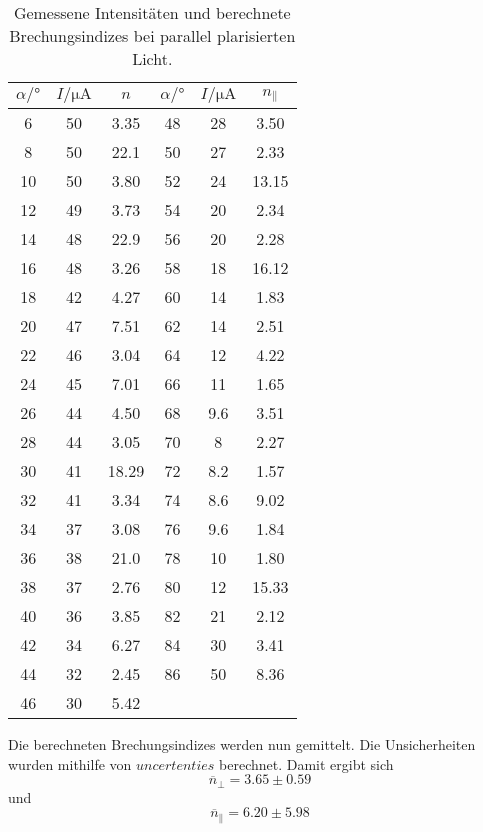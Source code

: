 \begin{table}[H]
  \centering
  \caption{Gemessene Intensitäten und berechnete Brechungsindizes bei parallel plarisierten Licht.}
  \label{tab:para}
  \begin{tabular}{c c c c c c}
    \toprule
    $\alpha /°$ & $I / \unit{\micro\ampere}$ & $n$ & $\alpha /°$ & $I / \unit{\micro\ampere}$ & $n_\parallel$\\
    \midrule 
    6  &  50  & 3.35  & 48 &  28   & 3.50 \\ 
    8  &  50  & 22.1  & 50 &  27   & 2.33 \\
    10 &  50  & 3.80  & 52 &  24   & 13.15 \\
    12 &  49  & 3.73  & 54 &  20   & 2.34  \\
    14 &  48  & 22.9  & 56 &  20   & 2.28  \\
    16 &  48  & 3.26  & 58 &  18   & 16.12 \\
    18 &  42  & 4.27  & 60 &  14   & 1.83  \\
    20 &  47  & 7.51  & 62 &  14   & 2.51  \\
    22 &  46  & 3.04  & 64 &  12   & 4.22  \\
    24 &  45  & 7.01  & 66 &  11   & 1.65  \\
    26 &  44  & 4.50  & 68 &  9.6  & 3.51  \\
    28 &  44  & 3.05  & 70 &  8    & 2.27  \\
    30 &  41  & 18.29  & 72 &  8.2  & 1.57  \\
    32 &  41  & 3.34  & 74 &  8.6  & 9.02   \\
    34 &  37  & 3.08  & 76 &  9.6  & 1.84  \\
    36 &  38  & 21.0  & 78 &  10   & 1.80  \\
    38 &  37  & 2.76  & 80 &  12   & 15.33  \\
    40 &  36  & 3.85  & 82 &  21   & 2.12  \\
    42 &  34  & 6.27  & 84 &  30   & 3.41   \\
    44 &  32  & 2.45  & 86 &  50   & 8.36   \\
    46 &  30  & 5.42  &    &       &      \\
    \bottomrule
  \end{tabular}
\end{table}

\noindent Die berechneten Brechungsindizes werden nun gemittelt.
Die Unsicherheiten wurden mithilfe von $uncertenties$ berechnet.
Damit ergibt sich 
\begin{equation*}
  \overline{n}_\perp = 3.65 \pm 0.59
\end{equation*}
und\begin{equation*}
  \overline{n}_\parallel = 6.20 \pm 5.98
\end{equation*}    

